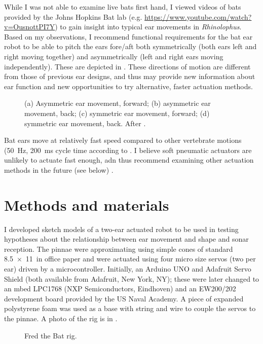 \documentclass{article}
\begin{document}
While I was not able to examine live bats first hand, I viewed videos of bats provided by the Johns Hopkins Bat lab (e.g. \url{https://www.youtube.com/watch?v=OusnottPI7Y}) to gain insight into typical ear movements in \emph{Rhinolophus}. Based on my observations, I recommend functional requirements for the bat ear robot to be able to pitch the ears fore/aft both symmetrically (both ears left and right moving together) and asymmetrically (left and right ears moving independently). These are depicted in . These directions of motion are different from those of previous ear designs, and thus may provide new information about ear function and new opportunities to try alternative, faster actuation methods. 
\begin{figure}[h]
\caption{(a) Asymmetric ear movement, forward; (b) asymmetric ear movement, back; (c) symmetric ear movement, forward; (d) symmetric ear movement, back. After \citep{pannala2013investigation}.}
\label{fig:2}
\end{figure}

Bat ears move at relatively fast speed compared to other vertebrate motions (\SI{50}{\hertz}, \SI{200}{\milli\second} cycle time according to \cite{pannala2013interplay}. I believe soft pneumatic actuators are unlikely to actuate fast enough, adn thus recommend examining other actuation methods in the future (see below) \citep{hines2017soft}. 





\section{Methods and materials}
I developed sketch models of a two-ear actuated robot to be used in testing hypotheses about the relationship between ear movement and shape and sonar reception. The pinnae were approximating using simple cones of standard \SI{8.5x11}{in} office paper and were actuated using four micro size servos (two per ear) driven by a microcontroller. Initially, an Arduino UNO and Adafruit Servo Shield (both available from Adafruit, New York, NY); these were later changed to an mbed LPC1768 (NXP Semiconductors, Eindhoven) and an EW200/202 development board provided by the US Naval Academy. A piece of expanded polystyrene foam was used as a base with string and wire to couple the servos to the pinnae. A photo of the rig is in .
\begin{figure}[h]
\begin{center}

\end{center}
\caption{Fred the Bat rig.}
\label{fig:3}
\end{figure}
\end{document}
